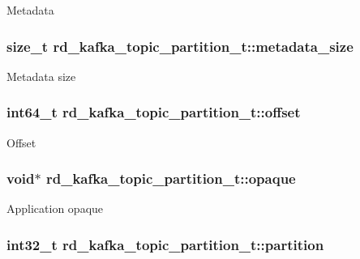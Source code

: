Metadata \hypertarget{structrd__kafka__topic__partition__t_a6f3387092692f325404bf3929247eede}{
\subsubsection[{metadata\-\_\-size}]{\setlength{\rightskip}{0pt plus 5cm}size\-\_\-t rd\-\_\-kafka\-\_\-topic\-\_\-partition\-\_\-t\-::metadata\-\_\-size}}\label{structrd__kafka__topic__partition__t_a6f3387092692f325404bf3929247eede}
Metadata size \hypertarget{structrd__kafka__topic__partition__t_a60c27c6a2f759b7fdfd382b93c12cd3c}{
\subsubsection[{offset}]{\setlength{\rightskip}{0pt plus 5cm}int64\-\_\-t rd\-\_\-kafka\-\_\-topic\-\_\-partition\-\_\-t\-::offset}}\label{structrd__kafka__topic__partition__t_a60c27c6a2f759b7fdfd382b93c12cd3c}
Offset \hypertarget{structrd__kafka__topic__partition__t_a8ab6583124ba3e7382be5b2148672a4c}{
\subsubsection[{opaque}]{\setlength{\rightskip}{0pt plus 5cm}void$\ast$ rd\-\_\-kafka\-\_\-topic\-\_\-partition\-\_\-t\-::opaque}}\label{structrd__kafka__topic__partition__t_a8ab6583124ba3e7382be5b2148672a4c}
Application opaque \hypertarget{structrd__kafka__topic__partition__t_aa37d08c9e5f4612f5a962405c65ae2c1}{
\subsubsection[{partition}]{\setlength{\rightskip}{0pt plus 5cm}int32\-\_\-t rd\-\_\-kafka\-\_\-topic\-\_\-partition\-\_\-t\-::partition}}\label{structrd__kafka__topic__partition__t_aa37d08c9e5f4612f5a962405c65ae2c1}
